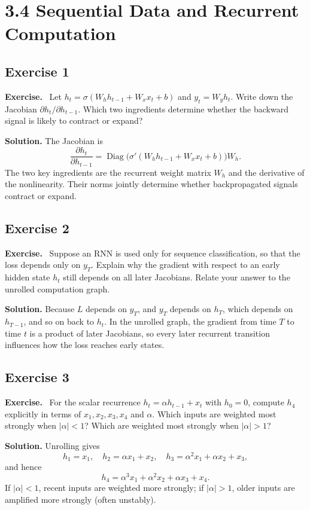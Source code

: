 \documentclass[11pt]{article}
\newenvironment{exercisebox}{\begin{framed}\noindent\textbf{Exercise.}\ }{\end{framed}}
\begin{document}
\section{3.4 Sequential Data and Recurrent Computation}
\subsection*{Exercise 1}
\begin{exercisebox}
Let $h_t = \sigma(W_h h_{t-1} + W_x x_t + b)$ and $y_t = W_y h_t$.
Write down the Jacobian $\partial h_t/\partial h_{t-1}$.
Which two ingredients determine whether the backward signal is likely to contract or expand?
\end{exercisebox}
\textbf{Solution.} The Jacobian is
\[
\frac{\partial h_t}{\partial h_{t-1}} = \operatorname{Diag}\bigl(\sigma'(W_hh_{t-1}+W_xx_t+b)\bigr)W_h.
\]
The two key ingredients are the recurrent weight matrix $W_h$ and the derivative of the nonlinearity. Their norms jointly determine whether backpropagated signals contract or expand.

\subsection*{Exercise 2}
\begin{exercisebox}
Suppose an RNN is used only for sequence classification, so that the loss depends only on $y_T$.
Explain why the gradient with respect to an early hidden state $h_t$ still depends on all later Jacobians.
Relate your answer to the unrolled computation graph.
\end{exercisebox}
\textbf{Solution.} Because $L$ depends on $y_T$, and $y_T$ depends on $h_T$, which depends on $h_{T-1}$, and so on back to $h_t$. In the unrolled graph, the gradient from time $T$ to time $t$ is a product of later Jacobians, so every later recurrent transition influences how the loss reaches early states.

\subsection*{Exercise 3}
\begin{exercisebox}
For the scalar recurrence $h_t=\alpha h_{t-1}+x_t$ with $h_0=0$, compute $h_4$ explicitly in terms of $x_1,x_2,x_3,x_4$ and $\alpha$.
Which inputs are weighted most strongly when $|\alpha|<1$?
Which are weighted most strongly when $|\alpha|>1$?
\end{exercisebox}
\textbf{Solution.} Unrolling gives
\[
h_1=x_1,
\quad h_2=\alpha x_1+x_2,
\quad h_3=\alpha^2x_1+\alpha x_2+x_3,
\]
and hence
\[
h_4=\alpha^3x_1+\alpha^2x_2+\alpha x_3+x_4.
\]
If $|\alpha|<1$, recent inputs are weighted more strongly; if $|\alpha|>1$, older inputs are amplified more strongly (often unstably).
\end{document}
